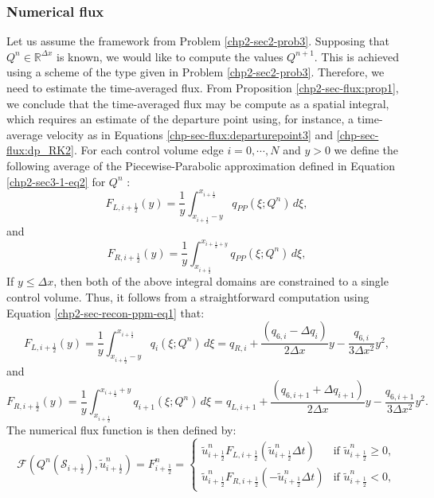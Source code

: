 \subsubsection{Numerical flux}
Let us assume the framework from Problem \ref{chp2-sec2-prob3}.
Supposing that $Q^{n} \in \mathbb{R}^{\Delta x}$ is known,
we would like to compute the values $Q^{n+1}$.
This is achieved using a scheme of the type given in Problem \ref{chp2-sec2-prob3}.
Therefore, we need to estimate the time-averaged flux. 
From Proposition \ref{chp2-sec-flux:prop1}, we conclude that the time-averaged flux
may be compute as a spatial integral, which requires an estimate of the departure point using, for instance,
a time-average velocity as in Equations \eqref{chp-sec-flux:departurepoint3} and \eqref{chp-sec-flux:dp_RK2}.
For each control volume edge $i=0, \cdots, N$ and $y>0$ 
we define the following average of the Piecewise-Parabolic approximation
defined in Equation \eqref{chp2-sec3-1-eq2} for $Q^{n}$ \citep{colella:1984}:
\begin{equation}
	\label{chp-sec-flux:fL_1}
	F_{L,i+\frac{1}{2}}(y) = \frac{1}{y} \int_{x_{i+\frac{1}{2}}-y}^{x_{i+\frac{1}{2}}}
	q_{PP}(\xi;Q^n)\,d\xi,
\end{equation}
and
\begin{equation}
	\label{chp-sec-flux:fR_1}
	F_{R,i+\frac{1}{2}}(y) = \frac{1}{y} \int_{x_{i+\frac{1}{2}}}^{x_{i+\frac{1}{2}+y}}
	q_{PP}(\xi;Q^n)\,d\xi,
\end{equation}
If $y \leq \Delta x$, then both of the above integral domains
are constrained to a single control volume. Thus,
it follows from a straightforward computation using 
Equation \eqref{chp2-sec-recon-ppm-eq1} that:
\begin{equation}
	\label{chp-sec-flux:fL_2}
	F_{L,i+\frac{1}{2}}(y) = \frac{1}{y} \int_{x_{i+\frac{1}{2}}-y}^{x_{i+\frac{1}{2}}}
	q_{i}(\xi;Q^n)\,d\xi = 
	q_{R,i} +\frac{(q_{6,i} - \Delta q_i)}{2\Delta x}y
	- \frac{q_{6,i}}{3\Delta x^2}y^2,
\end{equation}
and
\begin{equation}
	\label{chp-sec-flux:fR_2}
	F_{R,i+\frac{1}{2}}(y) = \frac{1}{y} \int_{x_{i+\frac{1}{2}}}^{x_{i+\frac{1}{2}}+y}
	q_{i+1}(\xi;Q^n)\,d\xi = 
	q_{L,i+1} +\frac{(q_{6,i+1} + \Delta q_{i+1})}{2\Delta x}y
	- \frac{q_{6,i+1}}{3\Delta x^2}y^2.
\end{equation}
The numerical flux function is then defined by:
\begin{equation}
	\label{chp-sec-flux:numerical-flux}
	\mathcal{F}(Q^n(\mathcal{S}_{i+\frac{1}{2}}),\tilde{u}_{i+\frac{1}{2}}^n) = F_{i+\frac{1}{2}}^n =  
    	\begin{cases}
		\tilde{u}_{i+\frac{1}{2}}^nF_{L,i+\frac{1}{2}}( \tilde{u}_{i+\frac{1}{2}}^n\Delta t) & \text{if } \tilde{u}_{i+\frac{1}{2}}^n \geq 0,\\
		\tilde{u}_{i+\frac{1}{2}}^nF_{R,i+\frac{1}{2}}(-\tilde{u}_{i+\frac{1}{2}}^n\Delta t) & \text{if } \tilde{u}_{i+\frac{1}{2}}^n<0,
    	\end{cases}
\end{equation}
